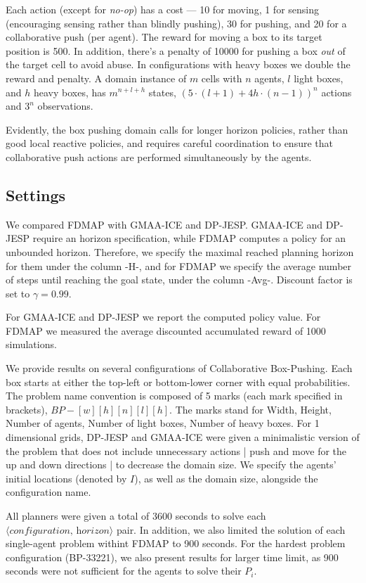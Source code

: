 \documentclass[letterpaper]{article} %
\theoremstyle{definition}
\newcommand{\cbp}[0]{Collaborative Box-Pushing}
\begin{document}
 


Each action (except for {\em no-op}) has a cost --- 10 for moving, 1 for sensing (encouraging sensing rather than blindly pushing), 30 for pushing, and 20 for a collaborative push (per agent). The reward for moving a box to its target position is 500. In addition, there's a penalty of 10000 for pushing a box \emph{out} of the target cell to avoid abuse. In configurations with heavy boxes we double the reward and penalty.
A domain instance of $m$ cells with $n$ agents, $l$ light boxes, and $h$ heavy boxes, has $m^{n+l+h}$ states, $(5\cdot(l+1)+4h\cdot(n-1))^n$ actions and $3^n$ observations.

Evidently, the box pushing domain calls for longer horizon policies, rather than good local reactive policies, and requires careful coordination to ensure that collaborative push actions are performed simultaneously by the agents.
 

\subsection{Settings} 

We compared FDMAP with GMAA-ICE and DP-JESP. GMAA-ICE and DP-JESP require an horizon specification, while FDMAP computes a policy for an unbounded horizon. Therefore, we specify the maximal reached planning horizon for them under the column -H-, and for FDMAP we specify the average number of steps until reaching the goal state, under the column -Avg-. Discount factor is set to $\gamma=0.99$.

For GMAA-ICE and DP-JESP we report the computed policy value. For FDMAP we measured the average discounted accumulated reward of 1000 simulations.

We provide results on several configurations of \cbp. Each box starts at either the top-left or bottom-lower corner with equal probabilities. The problem name convention is composed of 5 marks (each mark specified in brackets), $\textit{BP}-[w][h][n][l][h]$. The marks stand for
Width, Height, Number of agents, Number of light boxes, Number of heavy boxes. For 1 dimensional grids, DP-JESP and GMAA-ICE were given a minimalistic version of the problem that does not include unnecessary actions | push and move for the up and down directions | to decrease the domain size. We specify the agents' initial locations (denoted by $I$), as well as the domain size, alongside the configuration name.

All planners were given a total of 3600 seconds  to solve each $\langle\textit{configuration, horizon}\rangle$ pair.
In addition, we also limited the solution of each single-agent problem withint FDMAP to 900 seconds.
For the hardest problem configuration (BP-33221), we also present results for larger time limit, as 900 seconds were not sufficient for the agents to solve their $P_i$.
\end{document}
